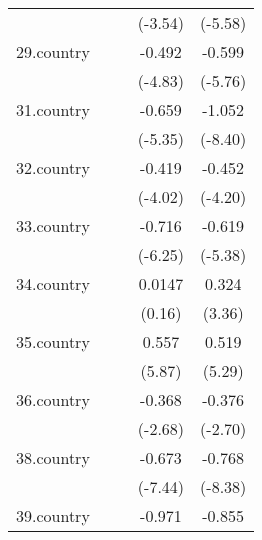{\begin{tabular}{l*{4}{c}}
            &                     &                     &     (-3.54)         &     (-5.58)         \\
[1em]
29.country  &                     &                     &      -0.492\sym{***}&      -0.599\sym{***}\\
            &                     &                     &     (-4.83)         &     (-5.76)         \\
[1em]
31.country  &                     &                     &      -0.659\sym{***}&      -1.052\sym{***}\\
            &                     &                     &     (-5.35)         &     (-8.40)         \\
[1em]
32.country  &                     &                     &      -0.419\sym{***}&      -0.452\sym{***}\\
            &                     &                     &     (-4.02)         &     (-4.20)         \\
[1em]
33.country  &                     &                     &      -0.716\sym{***}&      -0.619\sym{***}\\
            &                     &                     &     (-6.25)         &     (-5.38)         \\
[1em]
34.country  &                     &                     &      0.0147         &       0.324\sym{***}\\
            &                     &                     &      (0.16)         &      (3.36)         \\
[1em]
35.country  &                     &                     &       0.557\sym{***}&       0.519\sym{***}\\
            &                     &                     &      (5.87)         &      (5.29)         \\
[1em]
36.country  &                     &                     &      -0.368\sym{**} &      -0.376\sym{**} \\
            &                     &                     &     (-2.68)         &     (-2.70)         \\
[1em]
38.country  &                     &                     &      -0.673\sym{***}&      -0.768\sym{***}\\
            &                     &                     &     (-7.44)         &     (-8.38)         \\
[1em]
39.country  &                     &                     &      -0.971\sym{***}&      -0.855\sym{***}\\

\end{tabular}}
